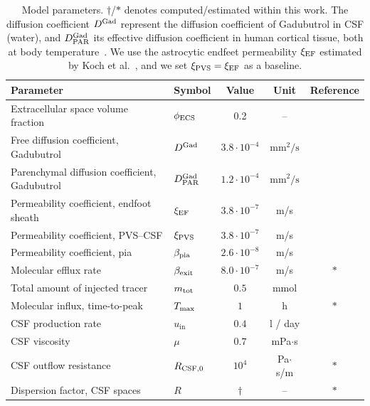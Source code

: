 \documentclass[fleqn,10pt]{wlscirep}
\begin{document}
\begin{table}
  \begin{center}
    \begin{tabular}{ll|ccc}
      \toprule
      Parameter& Symbol & Value & Unit& Reference\\
      \midrule
      Extracellular space volume fraction & $\phi_{\rm ECS}$ & 0.2 & -- & \cite{nicholson1981ion} \\
      Free diffusion coefficient, Gadubutrol & $D^{\rm Gad}$ & $3.8 \cdot 10^{-4}$& $\text{mm}^2/\text{s}$ & \cite{valnes2020apparent}\\
      Parenchymal diffusion coefficient, Gadubutrol & $D^{\rm Gad}_{\rm PAR}$ & $1.2 \cdot 10^{-4}$ & $\text{mm}^2/\text{s}$  & \cite{hornkjol2022csf} \\
      Permeability coefficient, endfoot sheath & $\xi_{\rm EF}$ & $3.8\cdot 10^{-7}$  & m/s & \cite{koch2023estimates} \\
      Permeability coefficient, PVS--CSF & $\xi_{\rm PVS}$ & $3.8\cdot 10^{-7}$  & m/s & \cite{koch2023estimates} \\
      Permeability coefficient, pia & $\beta_{\rm pia}$ & $2.6 \cdot 10^{-8}$ & m/s & \cite{riseth2025twocompartment} \\
      Molecular efflux rate & $\beta_{\rm exit}$ & $8.0 \cdot 10^{-7}$ & m/s & $\ast$ \\
      Total amount of injected tracer & $m_{\rm tot}$ & $0.5$ & mmol & \cite{eide2024functional} \\
      Molecular influx, time-to-peak & $T_{\rm max}$ & $1$ & h & $\ast$ \\
      CSF production rate & $u_{\mathrm{in}}$ & $0.4$  & l / day & \cite{nilsson1992circadian} \\
      CSF viscosity & $\mu$ & $0.7$ & mPa$ \cdot $s & \cite{bloomfield1998effects} \\ 
      CSF outflow resistance & $R_{\rm CSF, 0}$ & $10^{4}$  & Pa$\cdot$s/m & $\ast$ \\ 
      Dispersion factor, CSF spaces & $R$ & $\dagger$ & -- & $\ast$ \\
      \bottomrule
    \end{tabular}
  \end{center}
  \caption{Model parameters. $\dagger$/$\ast$ denotes
    computed/estimated within this work. The diffusion coefficient
    $D^{\rm Gad}$ represent the diffusion coefficient of Gadubutrol in
    CSF (water), and $D^{\rm Gad}_{\rm PAR}$ its effective diffusion
    coefficient in human cortical tissue, both at body
    temperature~\cite{sykova2008diffusion, valnes2020apparent,
      hornkjol2022csf}. We use the astrocytic endfeet permeability
    $\xi_{\rm EF}$ estimated by Koch et al.~\cite{koch2023estimates},
    and we set $\xi_{\rm PVS} = \xi_{\rm EF}$ as a baseline.}
  \label{tab:parameters}
\end{table}
\end{document}
